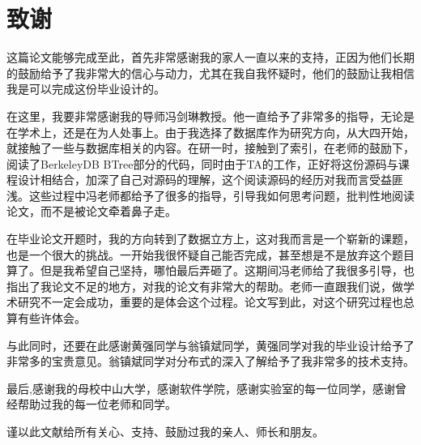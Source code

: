 
\chapter{致谢}

这篇论文能够完成至此，首先非常感谢我的家人一直以来的支持，正因为他们长期的鼓励给予了我非常大的信心与动力，尤其在我自我怀疑时，他们的鼓励让我相信我是可以完成这份毕业设计的。

在这里，我要非常感谢我的导师冯剑琳教授。他一直给予了非常多的指导，无论是在学术上，还是在为人处事上。由于我选择了数据库作为研究方向，从大四开始，就接触了一些与数据库相关的内容。在研一时，接触到了索引，在老师的鼓励下，阅读了BerkeleyDB BTree部分的代码，同时由于TA的工作，正好将这份源码与课程设计相结合，加深了自己对源码的理解，这个阅读源码的经历对我而言受益匪浅。这些过程中冯老师都给予了很多的指导，引导我如何思考问题，批判性地阅读论文，而不是被论文牵着鼻子走。

在毕业论文开题时，我的方向转到了数据立方上，这对我而言是一个崭新的课题，也是一个很大的挑战。一开始我很怀疑自己能否完成，甚至想是不是放弃这个题目算了。但是我希望自己坚持，哪怕最后弄砸了。这期间冯老师给了我很多引导，也指出了我论文不足的地方，对我的论文有非常大的帮助。老师一直跟我们说，做学术研究不一定会成功，重要的是体会这个过程。论文写到此，对这个研究过程也总算有些许体会。

与此同时，还要在此感谢黄强同学与翁镇斌同学，黄强同学对我的毕业设计给予了非常多的宝贵意见。翁镇斌同学对分布式的深入了解给予了我非常多的技术支持。

最后,感谢我的母校中山大学，感谢软件学院，感谢实验室的每一位同学，感谢曾经帮助过我的每一位老师和同学。

谨以此文献给所有关心、支持、鼓励过我的亲人、师长和朋友。\nopagebreak
